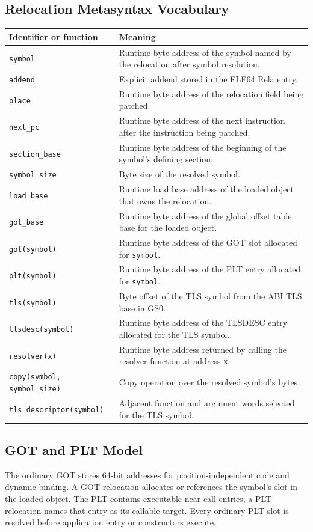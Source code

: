 \documentclass[10pt,twoside]{article}
\begin{document}
\subsection{Relocation Metasyntax Vocabulary}
\begingroup\footnotesize
\setlength{\tabcolsep}{2pt}
\begin{longtable}{@{}p{1.45in}p{4.05in}@{}}
\toprule
\textbf{Identifier or function} & \textbf{Meaning}\\
\midrule
\endhead
\texttt{symbol} & Runtime byte address of the symbol named by the relocation after symbol resolution.\\
\texttt{addend} & Explicit addend stored in the ELF64 Rela entry.\\
\texttt{place} & Runtime byte address of the relocation field being patched.\\
\texttt{next\_pc} & Runtime byte address of the next instruction after the instruction being patched.\\
\texttt{section\_base} & Runtime byte address of the beginning of the symbol's defining section.\\
\texttt{symbol\_size} & Byte size of the resolved symbol.\\
\texttt{load\_base} & Runtime load base address of the loaded object that owns the relocation.\\
\texttt{got\_base} & Runtime byte address of the global offset table base for the loaded object.\\
\texttt{got(symbol)} & Runtime byte address of the GOT slot allocated for \texttt{symbol}.\\
\texttt{plt(symbol)} & Runtime byte address of the PLT entry allocated for \texttt{symbol}.\\
\texttt{tls(symbol)} & Byte offset of the TLS symbol from the ABI TLS base in GS0.\\
\texttt{tlsdesc(symbol)} & Runtime byte address of the TLSDESC entry allocated for the TLS symbol.\\
\texttt{resolver(x)} & Runtime byte address returned by calling the resolver function at address \texttt{x}.\\
\texttt{copy(symbol, symbol\_size)} & Copy operation over the resolved symbol's bytes.\\
\texttt{tls\_descriptor(symbol)} & Adjacent function and argument words selected for the TLS symbol.\\
\bottomrule
\end{longtable}
\endgroup
\subsection{GOT and PLT Model}
The ordinary GOT stores 64-bit addresses for position-independent code and
dynamic binding. A GOT relocation allocates or references the symbol's slot in
the loaded object. The PLT contains executable near-call entries; a PLT
relocation names that entry as its callable target. Every
ordinary PLT slot is resolved before application entry or constructors execute.
\end{document}
